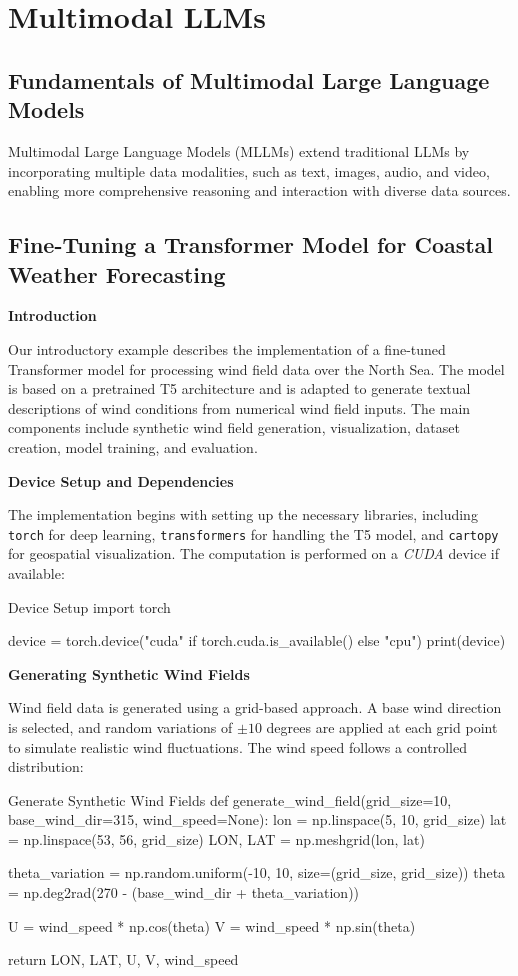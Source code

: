 \chapter{Multimodal LLMs}

\section{Fundamentals of Multimodal Large Language Models}
Multimodal Large Language Models (MLLMs) extend traditional LLMs by incorporating multiple data modalities, such as text, images, audio, and video, enabling more comprehensive reasoning and interaction with diverse data sources.

\section*{Fine-Tuning a Transformer Model for Coastal Weather Forecasting}

{\bf Introduction}

Our introductory example describes the implementation of a fine-tuned Transformer model for processing wind field data over the North Sea. The model is based on a pretrained T5 architecture and is adapted to generate textual descriptions of wind conditions from numerical wind field inputs. The main components include synthetic wind field generation, visualization, dataset creation, model training, and evaluation.

{\bf Device Setup and Dependencies}

The implementation begins with setting up the necessary libraries, including {\tt torch} for deep learning, {\tt transformers} for handling the T5 model, and {\tt cartopy} for geospatial visualization. The computation is performed on a \emph{CUDA} device if available:

\begin{codeonly}{Device Setup}
import torch

device = torch.device("cuda" if torch.cuda.is_available() else "cpu")
print(device)
\end{codeonly}

{\bf Generating Synthetic Wind Fields}

Wind field data is generated using a grid-based approach. A base wind direction is selected, and random variations of \(\pm10\) degrees are applied at each grid point to simulate realistic wind fluctuations. The wind speed follows a controlled distribution:

\begin{codeonly}{Generate Synthetic Wind Fields}
def generate_wind_field(grid_size=10, base_wind_dir=315, wind_speed=None):
    lon = np.linspace(5, 10, grid_size)
    lat = np.linspace(53, 56, grid_size)
    LON, LAT = np.meshgrid(lon, lat)
    
    theta_variation = np.random.uniform(-10, 10, size=(grid_size, grid_size))
    theta = np.deg2rad(270 - (base_wind_dir + theta_variation))
    
    U = wind_speed * np.cos(theta)
    V = wind_speed * np.sin(theta)
    
    return LON, LAT, U, V, wind_speed
\end{codeonly}

